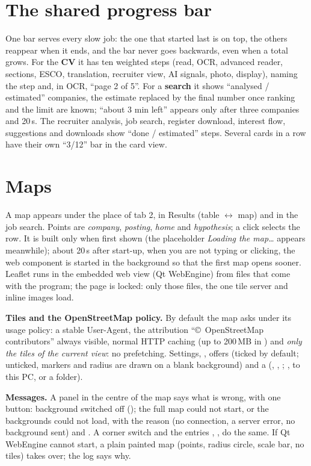 \section{The shared progress bar}\label{sec:bar}
One bar serves every slow job: the one that started last is on top, the others reappear when it ends, and the bar
never goes backwards, even when a total grows. For the \textbf{CV} it has ten weighted steps (read, OCR, advanced
reader, sections, ESCO, translation, recruiter view, AI signals, photo, display), naming the step and, in OCR, ``page
2 of 5''. For a \textbf{search} it shows ``analysed / estimated'' companies, the estimate replaced by the final number
once ranking and the limit are known; ``about 3 min left'' appears only after three companies and 20\,s. The recruiter
analysis, job search, register download, interest flow, suggestions and downloads show ``done / estimated'' steps.
Several cards in a row have their own ``3/12'' bar in the card view.

\section{Maps}\label{sec:map}
A map appears under the place of tab 2, in Results (table $\leftrightarrow$ map) and in the job search. Points are
\emph{company}, \emph{posting}, \emph{home} and \emph{hypothesis}; a click selects the row. It is built only when first
shown (the placeholder \emph{Loading the map\ldots} appears meanwhile); about 20\,s after start-up, when you are not
typing or clicking, the web component is started in the background so that the first map opens sooner. Leaflet runs in the embedded web view (Qt WebEngine) from files that come with the program; the page is locked:
only those files, the one tile server and inline images load.

\textbf{Tiles and the OpenStreetMap policy.} By default the map asks  under its usage
policy: a stable User-Agent, the attribution ``\copyright\ OpenStreetMap contributors'' always visible, normal HTTP
caching (up to 200\,MB in ) and \emph{only the tiles of the current view}: no prefetching.
Settings, , offers  (ticked by default; unticked, markers and radius are drawn on a blank background) and
a  (, , ; ,  to this PC, or a
 folder).

\textbf{Messages.} A panel in the centre of the map says what is wrong, with one button: background switched off
(); the full map could not start, or the backgrounds could not load, with the reason (no connection, a server
error, no background sent) and . A corner switch  and the  entries , ,  do the same. If Qt WebEngine cannot start, a plain painted
map (points, radius circle, scale bar, no tiles) takes over; the log says why.

